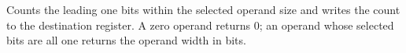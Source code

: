 Counts the leading one bits within the selected operand size and writes the count to the destination register. A zero operand returns 0; an operand whose selected bits are all one returns the operand width in bits.
